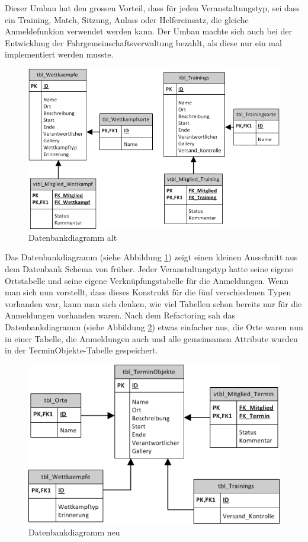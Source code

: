 Dieser Umbau hat den grossen Vorteil, dass für jeden Veranstaltungstyp, sei dass ein Training, Match, Sitzung, Anlass oder Helfereinsatz, die gleiche Anmeldefunkion verwendet werden kann. Der Umbau machte sich auch bei der Entwicklung der Fahrgemeinschaftsverwaltung bezahlt, als diese nur ein mal implementiert werden musste.\\

\begin{figure}[h]
\centering
\includegraphics[scale=0.5]{images/visio/datenbankdiagramm_alt.png}
\caption{Datenbankdiagramm alt}
\label{fig:db_schema_alt}
\end{figure}

Das Datenbankdiagramm (siehe Abbildung \ref{fig:db_schema_alt}) zeigt einen kleinen Ausschnitt aus dem Datenbank Schema von früher. Jeder Veranstaltungstyp hatte seine eigene Ortstabelle und seine eigene Verknüpfungstabelle für die Anmeldungen. Wenn man sich nun vorstellt, dass dieses Konstrukt für die fünf verschiedenen Typen vorhanden war, kann man sich denken, wie viel Tabellen schon bereits nur für die Anmeldungen vorhanden waren. Nach dem Refactoring sah das Datenbankdiagramm (siehe Abbildung \ref{fig:db_schema_neu}) etwas einfacher aus, die Orte waren nun in einer Tabelle, die Anmeldungen auch und alle gemeinsamen Attribute wurden in der TerminObjekte-Tabelle gespeichert.

\begin{figure}[h]
\centering
\includegraphics[scale=0.5]{images/visio/datenbankdiagramm_neu.png}
\caption{Datenbankdiagramm neu}
\label{fig:db_schema_neu}
\end{figure}

